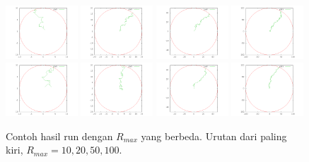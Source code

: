 \documentclass[paper=a4, fontsize=11pt]{scrartcl}
\numberwithin{equation}{section} %
\numberwithin{figure}{section} %
\numberwithin{table}{section} %
\begin{document}
\begin{figure}
	\includegraphics[width=0.24\textwidth]{hiker-plot-10-3.png}
	\includegraphics[width=0.24\textwidth]{hiker-plot-20-3.png}
	\includegraphics[width=0.24\textwidth]{hiker-plot-50-3.png}
	\includegraphics[width=0.24\textwidth]{hiker-plot-100-3.png}
	\includegraphics[width=0.24\textwidth]{hiker-plot-10-4.png}
	\includegraphics[width=0.24\textwidth]{hiker-plot-20-4.png}
	\includegraphics[width=0.24\textwidth]{hiker-plot-50-4.png}
	\includegraphics[width=0.24\textwidth]{hiker-plot-100-4.png}
	\caption{Contoh hasil run dengan $R_{max}$ yang berbeda. Urutan dari paling kiri, $R_{max} = 10, 20, 50, 100$.}
\end{figure}
\end{document}
